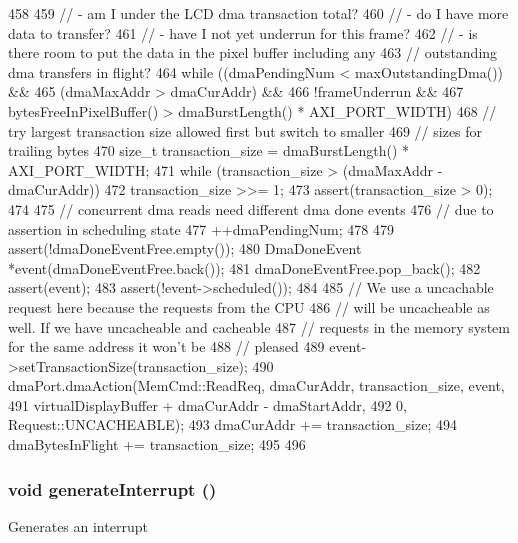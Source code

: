 \begin{DoxyCode}
458 {
459     // - am I under the LCD dma transaction total?
460     // - do I have more data to transfer?
461     // - have I not yet underrun for this frame?
462     // - is there room to put the data in the pixel buffer including any
463     //   outstanding dma transfers in flight?
464     while ((dmaPendingNum < maxOutstandingDma()) &&
465            (dmaMaxAddr > dmaCurAddr) &&
466            !frameUnderrun &&
467            bytesFreeInPixelBuffer() > dmaBurstLength() * AXI_PORT_WIDTH) {
468         // try largest transaction size allowed first but switch to smaller
469         // sizes for trailing bytes
470         size_t transaction_size = dmaBurstLength() * AXI_PORT_WIDTH;
471         while (transaction_size > (dmaMaxAddr - dmaCurAddr))
472             transaction_size >>= 1;
473         assert(transaction_size > 0);
474 
475         // concurrent dma reads need different dma done events
476         // due to assertion in scheduling state
477         ++dmaPendingNum;
478 
479         assert(!dmaDoneEventFree.empty());
480         DmaDoneEvent *event(dmaDoneEventFree.back());
481         dmaDoneEventFree.pop_back();
482         assert(event);
483         assert(!event->scheduled());
484 
485         // We use a uncachable request here because the requests from the CPU
486         // will be uncacheable as well. If we have uncacheable and cacheable
487         // requests in the memory system for the same address it won't be
488         // pleased
489         event->setTransactionSize(transaction_size);
490         dmaPort.dmaAction(MemCmd::ReadReq, dmaCurAddr, transaction_size, event,
491                           virtualDisplayBuffer + dmaCurAddr - dmaStartAddr,
492                           0, Request::UNCACHEABLE);
493         dmaCurAddr += transaction_size;
494         dmaBytesInFlight += transaction_size;
495     }
496 }
\end{DoxyCode}
\hypertarget{classHDLcd_ab251ef5c4d9e1f0239542a9d8aa0dc3e}{
\subsubsection[{generateInterrupt}]{\setlength{\rightskip}{0pt plus 5cm}void generateInterrupt ()}}
\label{classHDLcd_ab251ef5c4d9e1f0239542a9d8aa0dc3e}
Generates an interrupt 


